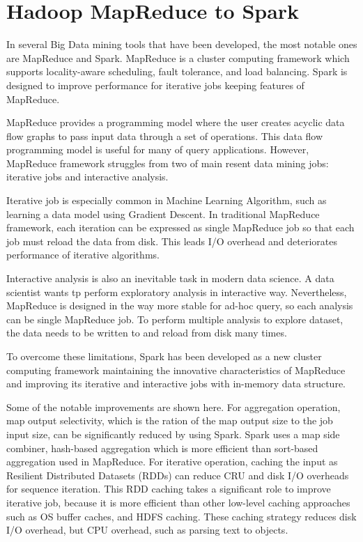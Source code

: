 \section{Hadoop MapReduce to Spark}
\label{sec:history}
In several Big Data mining tools that have been developed, the most notable ones are MapReduce and Spark. MapReduce is a cluster computing framework 
which supports locality-aware scheduling, fault tolerance, and load balancing. Spark is designed to improve performance for iterative jobs keeping features of MapReduce. 

MapReduce provides a programming model where the user creates acyclic data flow graphs to pass input data through a set of operations. This 
data flow programming model is useful for many of query applications. However, MapReduce framework struggles from two of main resent data mining jobs: iterative jobs and interactive analysis. 

Iterative job is especially common in Machine Learning Algorithm, such as learning a data model using Gradient Descent. In traditional MapReduce framework, each iteration can be expressed as single MapReduce job 
so that each job must reload the data from disk. This leads I/O overhead and deteriorates performance of iterative algorithms. 

Interactive analysis is also an inevitable task in modern data science. A data scientist wants tp perform exploratory analysis in interactive way. 
Nevertheless, MapReduce is designed in the way more stable for ad-hoc query, so each analysis can be single MapReduce job. 
To perform multiple analysis to explore dataset, the data needs to be written to and reload from disk many times. 

To overcome these limitations, Spark has been developed as a new cluster computing framework maintaining the innovative characteristics of MapReduce and improving 
its iterative and interactive jobs with in-memory data structure.

Some of the notable improvements are shown here\cite{DBLP:journals/pvldb/ShiQMJWRO15}. For aggregation operation, map output selectivity, which is the ration of the map output size to the job input size, 
can be significantly reduced by using Spark. Spark uses a map side combiner, hash-based aggregation which is more efficient than sort-based aggregation used in MapReduce. 
For iterative operation, caching the input as Resilient Distributed Datasets (RDDs) can reduce CRU and disk I/O overheads for sequence iteration. 
This RDD caching takes a significant role to improve iterative job, because it is more efficient than other low-level caching approaches such as OS buffer caches, and HDFS caching. 
These caching strategy reduces disk I/O overhead, but CPU overhead, such as parsing text to objects.


